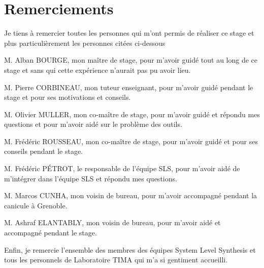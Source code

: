 \chapter*{Remerciements}
\justify
\setlength{\parindent}{0pt}
Je tiens à remercier toutes les personnes qui m'ont permis de réaliser ce stage et plus particulièrement les personnes citées ci-dessous

M. Alban BOURGE, mon maître de stage, pour m'avoir guidé tout au long de ce stage et sans qui cette expérience n'aurait pas pu avoir lieu.

M. Pierre CORBINEAU, mon tuteur enseignant, pour m'avoir guidé pendant le stage et pour ses motivations et conseils.

M. Olivier MULLER, mon co-maître de stage, pour m'avoir guidé et répondu mes questions et pour m'avoir aidé sur le problème des outils.

M. Frédéric ROUSSEAU, mon co-maître de stage, pour m'avoir guidé et pour ses conseils pendant le stage.

M. Frédéric PÉTROT, le responsable de l'équipe SLS, pour m'avoir aidé de m'intégrer dans l'équipe SLS et répondu mes questions.

M. Marcos CUNHA, mon voisin de bureau, pour m'avoir accompagné pendant la canicule à Grenoble.

M. Ashraf ELANTABLY, mon voisin de bureau, pour m'avoir aidé et accompagné pendant le stage.

Enfin, je remercie l'ensemble des membres des équipes System Level Synthesis et tous les personnels de Laboratoire TIMA qui m'a si gentiment accueilli.